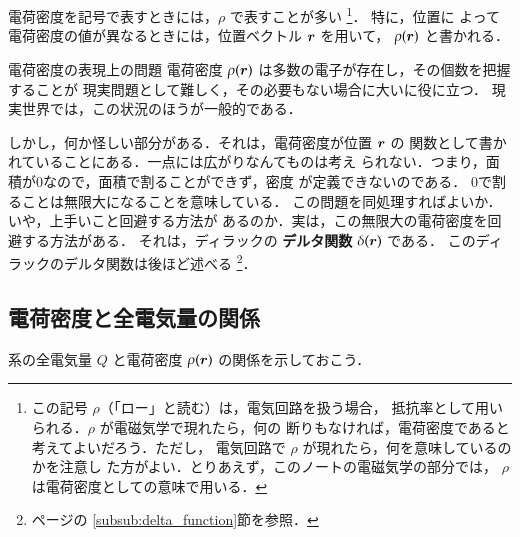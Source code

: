     電荷密度を記号で表すときには，$\rho$ で表すことが多い
        \footnote{
            この記号 $\rho$（「ロー」と読む）は，電気回路を扱う場合，
            抵抗率として用いられる．$\rho$ が電磁気学で現れたら，何の
            断りもなければ，電荷密度であると考えてよいだろう．ただし，
            電気回路で $\rho$ が現れたら，何を意味しているのかを注意し
            た方がよい．とりあえず，このノートの電磁気学の部分では，
            $\rho$ は電荷密度としての意味で用いる．
        }．
    特に，位置に
    よって電荷密度の値が異なるときには，位置ベクトル $\boldsymbol{r}$ を用いて，
    $\rho(\boldsymbol{r})$ と書かれる．

    \begin{memo}{電荷密度の表現上の問題}
        電荷密度 $\rho(\boldsymbol{r})$ は多数の電子が存在し，その個数を把握することが
        現実問題として難しく，その必要もない場合に大いに役に立つ．
        現実世界では，この状況のほうが一般的である．

        しかし，何か怪しい部分がある．それは，電荷密度が位置 $\boldsymbol{r}$ の
        関数として書かれていることにある．一点には広がりなんてものは考え
        られない．つまり，面積が0なので，面積で割ることができず，密度
        が定義できないのである．
        0で割ることは無限大になることを意味している．
        この問題を同処理すればよいか．いや，上手いこと回避する方法が
        あるのか．実は，この無限大の電荷密度を回避する方法がある．
        それは，ディラックの \textbf{デルタ関数} $\delta(\boldsymbol{r})$ である．
        このディラックのデルタ関数は後ほど述べる
            \footnote{
                \pageref{subsub:delta_function}ページの
                \ref{subsub:delta_function}節を参照．
            }．
    \end{memo}

    \subsection{電荷密度と全電気量の関係}
    系の全電気量 $Q$ と電荷密度 $\rho(\boldsymbol{r})$ の関係を示しておこう．

